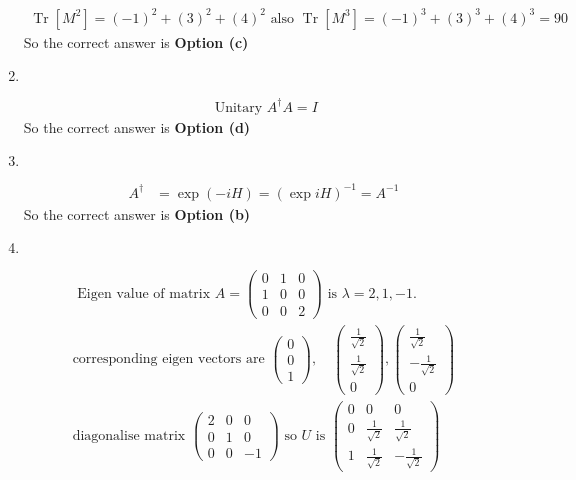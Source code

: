 \begin{enumerate}
\begin{answer}
\begin{align*}
		 \operatorname{Tr}\left[M^{2}\right]=(-1)^{2}+(3)^{2}+(4)^{2}\text{ also } \operatorname{Tr}\left[M^{3}\right]=(-1)^{3}+(3)^{3}+(4)^{3}=90
		\end{align*}
		So the correct answer is \textbf{Option (c)}
	\end{answer}
	\item $\left. \right. $	
	\begin{answer}
		\begin{align*}
	\text{	Unitary }A^{\dagger} A=I
		\end{align*}
		So the correct answer is \textbf{Option (d)}
	\end{answer}
	\item $\left. \right. $		
	\begin{answer}
		\begin{align*}
		A^{\dagger}&=\exp (-i H)=(\exp i H)^{-1}=A^{-1}
		\end{align*}
	So the correct answer is \textbf{Option (b)}
	\end{answer}
		\item $\left. \right. $	
	\begin{answer}
		\begin{align*}
	\text{	Eigen value of matrix }A=\left(\begin{array}{lll}0 & 1 & 0 \\ 1 & 0 & 0 \\ 0 & 0 & 2\end{array}\right)\text{ is }\lambda=2,1,-1.\\
	\text{corresponding eigen vectors are }\left(\begin{array}{l}0 \\ 0 \\ 1\end{array}\right), \quad\left(\begin{array}{c}\frac{1}{\sqrt{2}} \\ \frac{1}{\sqrt{2}} \\ 0\end{array}\right),\left(\begin{array}{c}\frac{1}{\sqrt{2}} \\ -\frac{1}{\sqrt{2}} \\ 0\end{array}\right)\\
	\text{diagonalise matrix }\left(\begin{array}{ccc}2 & 0 & 0 \\ 0 & 1 & 0 \\ 0 & 0 & -1\end{array}\right)\text{ so $U$ is }\left(\begin{array}{ccc}0 & 0 & 0 \\ 0 & \frac{1}{\sqrt{2}} & \frac{1}{\sqrt{2}} \\ 1 & \frac{1}{\sqrt{2}} & -\frac{1}{\sqrt{2}}\end{array}\right)

\end{align*}
\end{answer}
\end{enumerate}
